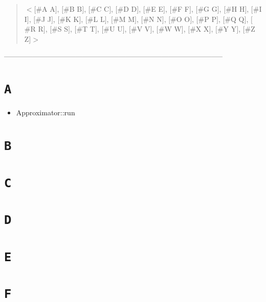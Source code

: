 \documentclass[10pt]{article}%
\begin{document}
\begin{quotation} \mbox{$<$}\mbox{$[$}\#A A\mbox{$]$}, \mbox{$[$}\#B B\mbox{$]$}, \mbox{$[$}\#C C\mbox{$]$}, \mbox{$[$}\#D D\mbox{$]$}, \mbox{$[$}\#E E\mbox{$]$}, \mbox{$[$}\#F F\mbox{$]$}, \mbox{$[$}\#G G\mbox{$]$}, \mbox{$[$}\#H H\mbox{$]$}, \mbox{$[$}\#I I\mbox{$]$}, \mbox{$[$}\#J J\mbox{$]$}, \mbox{$[$}\#K K\mbox{$]$}, \mbox{$[$}\#L L\mbox{$]$}, \mbox{$[$}\#M M\mbox{$]$}, \mbox{$[$}\#N N\mbox{$]$}, \mbox{$[$}\#O O\mbox{$]$}, \mbox{$[$}\#P P\mbox{$]$}, \mbox{$[$}\#Q Q\mbox{$]$}, \mbox{$[$}\#R R\mbox{$]$}, \mbox{$[$}\#S S\mbox{$]$}, \mbox{$[$}\#T T\mbox{$]$}, \mbox{$[$}\#U U\mbox{$]$}, \mbox{$[$}\#V V\mbox{$]$}, \mbox{$[$}\#W W\mbox{$]$}, \mbox{$[$}\#X X\mbox{$]$}, \mbox{$[$}\#Y Y\mbox{$]$}, \mbox{$[$}\#Z Z\mbox{$]$}\mbox{$>$}\end{quotation}
--------------------------------------------------------------------------------------------

\section*{\texttt{A}}

\label{f0}\begin{itemize}\item  Approximator::run
\end{itemize}

\section*{\texttt{B}}


\section*{\texttt{C}}


\section*{\texttt{D}}


\section*{\texttt{E}}


\section*{\texttt{F}}
\end{document}
